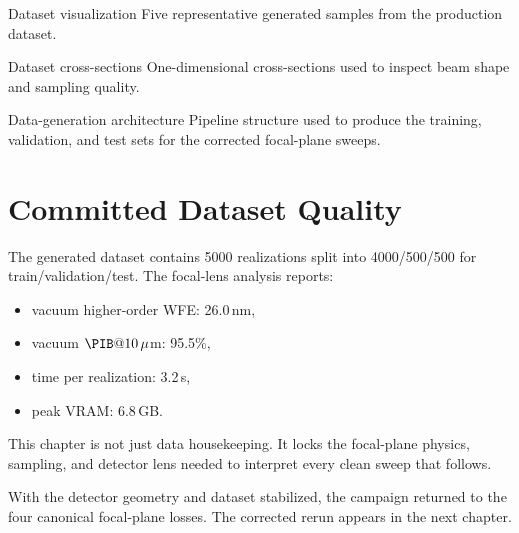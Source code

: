   {Dataset visualization}
  {Five representative generated samples from the production dataset.}

  {Dataset cross-sections}
  {One-dimensional cross-sections used to inspect beam shape and sampling
  quality.}

  {Data-generation architecture}
  {Pipeline structure used to produce the training, validation, and test sets
  for the corrected focal-plane sweeps.}

\section{Committed Dataset Quality}

The generated dataset contains 5000 realizations split into 4000/500/500 for
train/validation/test. The focal-lens analysis reports:
\begin{itemize}
  \item vacuum higher-order WFE: 26.0\,nm,
  \item vacuum $\PIB@10\,\mu$m: 95.5\%,
  \item time per realization: 3.2\,s,
  \item peak VRAM: 6.8\,GB.
\end{itemize}

\begin{keyinsight}
This chapter is not just data housekeeping. It locks the focal-plane physics,
sampling, and detector lens needed to interpret every clean sweep that follows.
\end{keyinsight}

With the detector geometry and dataset stabilized, the campaign returned to the
four canonical focal-plane losses. The corrected rerun appears in the next
chapter.
